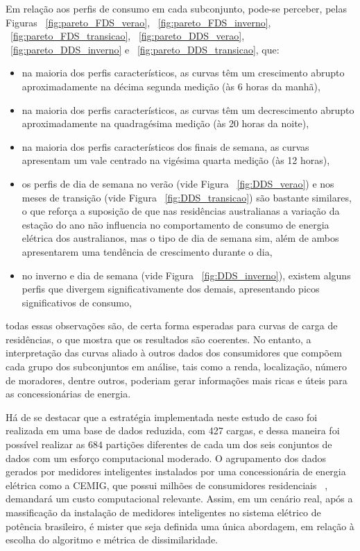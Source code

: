 Em relação aos perfis de consumo em cada subconjunto, pode-se perceber, pelas Figuras  ~\ref{fig:pareto_FDS_verao}, ~\ref{fig:pareto_FDS_inverno}, ~\ref{fig:pareto_FDS_transicao}, ~\ref{fig:pareto_DDS_verao}, ~\ref{fig:pareto_DDS_inverno} e ~\ref{fig:pareto_DDS_transicao}, que:
\begin{itemize}
	\item na maioria dos perfis característicos, as curvas têm um crescimento abrupto aproximadamente na décima segunda medição (às 6 horas da manhã),
	\item na maioria dos perfis característicos, as curvas têm um decrescimento abrupto aproximadamente na quadragésima medição (às 20 horas da noite),
	\item na maioria dos perfis característicos dos finais de semana, as curvas apresentam um vale centrado na vigésima quarta medição (às 12 horas),
	\item os perfis de dia de semana no verão (vide Figura ~\ref{fig:DDS_verao}) e nos meses de transição (vide Figura ~\ref{fig:DDS_transicao}) são bastante similares, o que reforça a suposição de que nas residências australianas a variação da estação do ano não influencia no comportamento de consumo de energia elétrica dos australianos, mas o tipo de dia de semana sim, além de ambos apresentarem uma tendência de crescimento durante o dia,
	\item no inverno e dia de semana (vide Figura ~\ref{fig:DDS_inverno}), existem alguns perfis que divergem significativamente dos demais, apresentando picos significativos de consumo,
\end{itemize}
todas essas observações são, de certa forma esperadas para curvas de carga de residências, o que mostra que os resultados são coerentes. No entanto, a interpretação das curvas aliado à outros dados dos consumidores que compõem cada grupo dos subconjuntos em análise, tais como a renda, localização, número de moradores, dentre outros, poderiam gerar informações mais ricas e úteis para as concessionárias de energia.


Há de se destacar que a estratégia implementada neste estudo de caso foi realizada em uma base de dados reduzida, com 427 cargas, e dessa maneira foi possível realizar as $684$ partições diferentes de cada um dos seis conjuntos de dados com um esforço computacional moderado. O agrupamento dos dados gerados por medidores inteligentes instalados por uma concessionária de energia elétrica como a CEMIG, que possui milhões de consumidores residenciais ~\parencite{DadosCemig}, demandará um custo computacional relevante. Assim, em um cenário real, após a massificação da instalação de medidores inteligentes no sistema elétrico de potência brasileiro, é mister que seja definida uma única abordagem, em relação à escolha do algoritmo e métrica de dissimilaridade.

